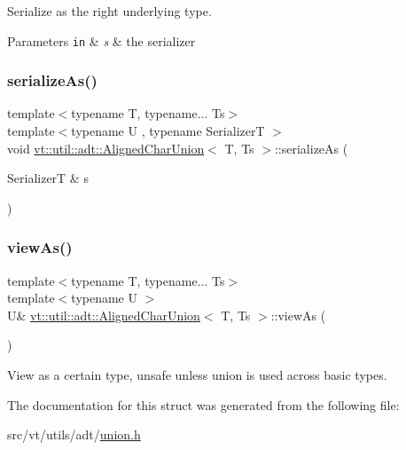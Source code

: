 Serialize as the right underlying type. 


\begin{DoxyParams}[1]{Parameters}
\mbox{\tt in}  & {\em s} & the serializer \\
\hline
\end{DoxyParams}
\mbox{\label{structvt_1_1util_1_1adt_1_1_aligned_char_union_a1278b482c837c11fd2f6f41b7f8b0f33}} 
\subsubsection{\texorpdfstring{serialize\+As()}{serializeAs()}}
{\footnotesize\ttfamily template$<$typename T, typename... Ts$>$ \\
template$<$typename U , typename SerializerT $>$ \\
void \hyperlink{structvt_1_1util_1_1adt_1_1_aligned_char_union}{vt\+::util\+::adt\+::\+Aligned\+Char\+Union}$<$ T, Ts $>$\+::serialize\+As (\begin{DoxyParamCaption}\item[{SerializerT \&}]{s }\end{DoxyParamCaption})\hspace{0.3cm}{\ttfamily [inline]}}

\mbox{\label{structvt_1_1util_1_1adt_1_1_aligned_char_union_af9bd3e00a355dca08d88103852f716ce}} 
\subsubsection{\texorpdfstring{view\+As()}{viewAs()}}
{\footnotesize\ttfamily template$<$typename T, typename... Ts$>$ \\
template$<$typename U $>$ \\
U\& \hyperlink{structvt_1_1util_1_1adt_1_1_aligned_char_union}{vt\+::util\+::adt\+::\+Aligned\+Char\+Union}$<$ T, Ts $>$\+::view\+As (\begin{DoxyParamCaption}{ }\end{DoxyParamCaption})\hspace{0.3cm}{\ttfamily [inline]}}



View as a certain type, unsafe unless union is used across basic types. 



The documentation for this struct was generated from the following file\+:\begin{DoxyCompactItemize}
\item 
src/vt/utils/adt/\hyperlink{union_8h}{union.\+h}\end{DoxyCompactItemize}
